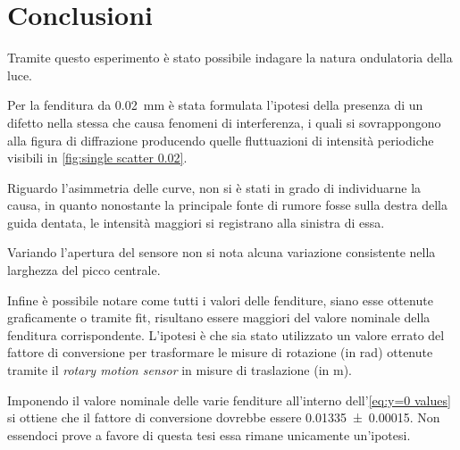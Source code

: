 \documentclass[../main.tex]{subfiles}
\begin{document}
\section{Conclusioni}

Tramite questo esperimento è stato possibile indagare la natura ondulatoria della luce.

Per la fenditura da \qty{0.02}{\mm} è stata formulata l'ipotesi della presenza di un difetto nella stessa che causa fenomeni di interferenza, i quali si sovrappongono alla figura di diffrazione producendo quelle fluttuazioni di intensità periodiche visibili in \autoref{fig:single scatter 0.02}.

Riguardo l'asimmetria delle curve, non si è stati in grado di individuarne la causa, in quanto nonostante la principale fonte di rumore fosse sulla destra della guida dentata, le intensità maggiori si registrano alla sinistra di essa. %

Variando l'apertura del sensore non si nota alcuna variazione consistente nella larghezza del picco centrale.

Infine è possibile notare come tutti i valori delle fenditure, siano esse ottenute graficamente o tramite fit, risultano essere maggiori del valore nominale della fenditura corrispondente. L'ipotesi è che sia stato utilizzato un valore errato %
del fattore di conversione per trasformare le misure di rotazione (in \si{\radian}) ottenute tramite il \textit{rotary motion sensor} in misure di traslazione (in \si{\m}).

Imponendo il valore nominale delle varie fenditure all'interno dell'\autoref{eq:y=0 values} si ottiene che %
il fattore di conversione dovrebbe essere \num{0.01335+-0.00015}. Non essendoci prove a favore di questa tesi essa rimane unicamente un'ipotesi.
\end{document}
